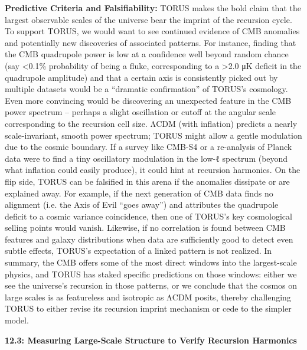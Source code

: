 \documentclass[]{article}
\begin{document}
\textbf{Predictive Criteria and Falsifiability:} TORUS makes the bold
claim that the largest observable scales of the universe bear the
imprint of the recursion cycle. To support TORUS, we would want to see
continued evidence of CMB anomalies and potentially new discoveries of
associated patterns. For instance, finding that the CMB quadrupole power
is low at a confidence well beyond random chance (say \textless{}0.1\%
probability of being a fluke, corresponding to a \textgreater{}2.0 μK
deficit in the quadrupole amplitude) and that a certain axis is
consistently picked out by multiple datasets would be a ``dramatic
confirmation'' of TORUS's cosmology. Even more convincing would be
discovering an unexpected feature in the CMB power spectrum -- perhaps a
slight oscillation or cutoff at the angular scale corresponding to the
recursion cell size. ΛCDM (with inflation) predicts a nearly
scale-invariant, smooth power spectrum; TORUS might allow a gentle
modulation due to the cosmic boundary. If a survey like CMB-S4 or a
re-analysis of Planck data were to find a tiny oscillatory modulation in
the low-ℓ spectrum (beyond what inflation could easily produce), it
could hint at recursion harmonics. On the flip side, TORUS can be
falsified in this arena if the anomalies dissipate or are explained
away. For example, if the next generation of CMB data finds no alignment
(i.e. the Axis of Evil ``goes away'') and attributes the quadrupole
deficit to a cosmic variance coincidence, then one of TORUS's key
cosmological selling points would vanish. Likewise, if no correlation is
found between CMB features and galaxy distributions when data are
sufficiently good to detect even subtle effects, TORUS's expectation of
a linked pattern is not realized. In summary, the CMB offers some of the
most direct windows into the largest-scale physics, and TORUS has staked
specific predictions on those windows: either we see the universe's
recursion in those patterns, or we conclude that the cosmos on large
scales is as featureless and isotropic as ΛCDM posits, thereby
challenging TORUS to either revise its recursion imprint mechanism or
cede to the simpler model.

\textbf{12.3: Measuring Large-Scale Structure to Verify Recursion
Harmonics}
\end{document}
